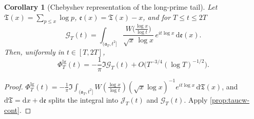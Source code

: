 \documentclass[11pt,a4paper]{article}
\numberwithin{equation}{section}
\newtheorem{corollary}[theorem]{Corollary}
\theoremstyle{definition}
\theoremstyle{remark}
\begin{document}
\begin{corollary}[Chebyshev representation of the long-prime tail]\label{cor:taucw-cheb}
Let $\mathfrak T(x)=\sum_{p\le x}\log p$, $\mathfrak e(x)=\mathfrak T(x)-x$, and for $T\le t\le2T$
\begin{equation}\label{eq:taucw-G}
\mathscr G_T(t)=\int_{(\mathfrak a_T,t^2]}\frac{W\bigl(\frac{\log x}{\log t}\bigr)}{\sqrt x\,\log x}\,e^{it\log x}\,\mathrm d\mathfrak e(x).
\end{equation}
Then, uniformly in $t\in[T,2T]$,
\begin{equation}\label{eq:taucw-cheb}
\Phi^{\mathrm{lg}}_T(t)=-\frac1\pi\Im\mathscr G_T(t)+O\bigl(T^{-3/4}(\log T)^{-1/2}\bigr).
\end{equation}
\end{corollary}
\begin{proof}
$\Phi^{\mathrm{lg}}_T(t)=-\frac1\pi\Im\int_{(\mathfrak a_T,t^2]}W(\frac{\log x}{\log t})(\sqrt x\log x)^{-1}e^{it\log x}\,\mathrm d\mathfrak T(x)$, and $\mathrm d\mathfrak T=\mathrm dx+\mathrm d\mathfrak e$ splits the integral into $\mathscr J_T(t)$ and $\mathscr G_T(t)$. Apply \cref{prop:taucw-cont}.
\end{proof}
\end{document}
